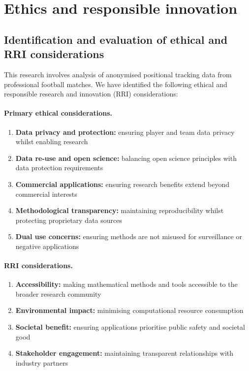 \section{Ethics and responsible innovation}

\subsection{Identification and evaluation of ethical and RRI considerations}

This research involves analysis of anonymised positional tracking data from professional football matches. We have identified the following ethical and responsible research and innovation (RRI) considerations:

\paragraph{Primary ethical considerations.}
\begin{enumerate}[label=\arabic*.]
  \item \textbf{Data privacy and protection:} ensuring player and team data privacy whilst enabling research
  \item \textbf{Data re-use and open science:} balancing open science principles with data protection requirements
  \item \textbf{Commercial applications:} ensuring research benefits extend beyond commercial interests
  \item \textbf{Methodological transparency:} maintaining reproducibility whilst protecting proprietary data sources
  \item \textbf{Dual use concerns:} ensuring methods are not misused for surveillance or negative applications
\end{enumerate}

\paragraph{RRI considerations.}
\begin{enumerate}[label=\arabic*.]
  \item \textbf{Accessibility:} making mathematical methods and tools accessible to the broader research community
  \item \textbf{Environmental impact:} minimising computational resource consumption
  \item \textbf{Societal benefit:} ensuring applications prioritise public safety and societal good
  \item \textbf{Stakeholder engagement:} maintaining transparent relationships with industry partners
\end{enumerate}

